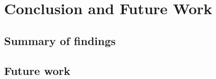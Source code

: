 \section{Conclusion and Future Work}\label{sec:conclusion}

\subsection{Summary of findings}\label{sec:concl-summary}

\subsection{Future work}\label{sec:concl-future}
